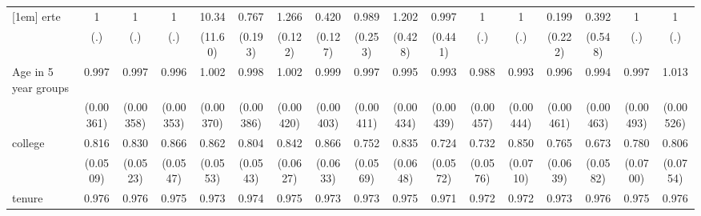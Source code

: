 {\begin{tabular}{l*{16}{c}}
[1em]
erte                &           1         &           1         &           1         &       10.34\sym{*}  &       0.767         &       1.266\sym{*}  &       0.420\sym{**} &       0.989         &       1.202         &       0.997         &           1         &           1         &       0.199         &       0.392         &           1         &           1         \\
                    &         (.)         &         (.)         &         (.)         &     (11.60)         &     (0.193)         &     (0.122)         &     (0.127)         &     (0.253)         &     (0.428)         &     (0.441)         &         (.)         &         (.)         &     (0.222)         &     (0.548)         &         (.)         &         (.)         \\
[1em]
Age in 5 year groups&       0.997         &       0.997         &       0.996         &       1.002         &       0.998         &       1.002         &       0.999         &       0.997         &       0.995         &       0.993         &       0.988\sym{*}  &       0.993         &       0.996         &       0.994         &       0.997         &       1.013\sym{*}  \\
                    &   (0.00361)         &   (0.00358)         &   (0.00353)         &   (0.00370)         &   (0.00386)         &   (0.00420)         &   (0.00403)         &   (0.00411)         &   (0.00434)         &   (0.00439)         &   (0.00457)         &   (0.00444)         &   (0.00461)         &   (0.00463)         &   (0.00493)         &   (0.00526)         \\
[1em]
college             &       0.816\sym{**} &       0.830\sym{**} &       0.866\sym{*}  &       0.862\sym{*}  &       0.804\sym{**} &       0.842\sym{*}  &       0.866\sym{*}  &       0.752\sym{***}&       0.835\sym{*}  &       0.724\sym{***}&       0.732\sym{***}&       0.850         &       0.765\sym{**} &       0.673\sym{***}&       0.780\sym{**} &       0.806\sym{*}  \\
                    &    (0.0509)         &    (0.0523)         &    (0.0547)         &    (0.0553)         &    (0.0543)         &    (0.0627)         &    (0.0633)         &    (0.0569)         &    (0.0648)         &    (0.0572)         &    (0.0576)         &    (0.0710)         &    (0.0639)         &    (0.0582)         &    (0.0700)         &    (0.0754)         \\
[1em]
tenure              &       0.976\sym{***}&       0.976\sym{***}&       0.975\sym{***}&       0.973\sym{***}&       0.974\sym{***}&       0.975\sym{***}&       0.973\sym{***}&       0.973\sym{***}&       0.975\sym{***}&       0.971\sym{***}&       0.972\sym{***}&       0.972\sym{***}&       0.973\sym{***}&       0.976\sym{***}&       0.975\sym{***}&       0.976\sym{***}\\

\end{tabular}}
